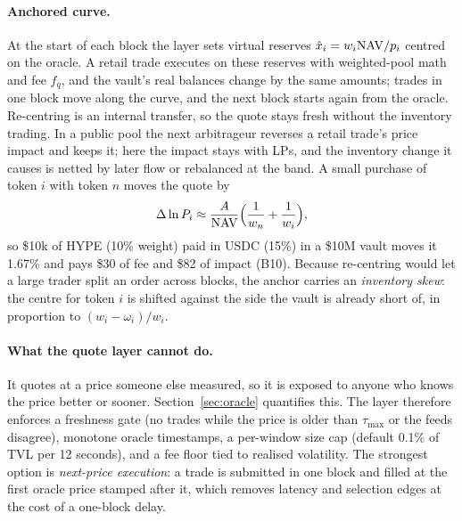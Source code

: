 \paragraph{Anchored curve.} At the start of each block the layer sets virtual reserves $\hat x_i=w_i\mathrm{NAV}/p_i$ centred on the oracle. A retail trade executes on these reserves with weighted-pool math and fee $f_q$, and the vault's real balances change by the same amounts; trades in one block move along the curve, and the next block starts again from the oracle. Re-centring is an internal transfer, so the quote stays fresh without the inventory trading. In a public pool the next arbitrageur reverses a retail trade's price impact and keeps it; here the impact stays with LPs, and the inventory change it causes is netted by later flow or rebalanced at the band. A small purchase of token $i$ with token $n$ moves the quote by
\begin{equation}
\Delta\ln P_i\approx\frac{A}{\mathrm{NAV}}\Big(\frac{1}{w_n}+\frac{1}{w_i}\Big),
\label{eq:impact}
\end{equation}
so \$10k of HYPE (10\% weight) paid in USDC (15\%) in a \$10M vault moves it 1.67\% and pays \$30 of fee and \$82 of impact (B10). Because re-centring would let a large trader split an order across blocks, the anchor carries an \emph{inventory skew}: the centre for token $i$ is shifted against the side the vault is already short of, in proportion to $(w_i-\omega_i)/w_i$.

\paragraph{What the quote layer cannot do.} It quotes at a price someone else measured, so it is exposed to anyone who knows the price better or sooner. Section~\ref{sec:oracle} quantifies this. The layer therefore enforces a freshness gate (no trades while the price is older than $\tau_{\max}$ or the feeds disagree), monotone oracle timestamps, a per-window size cap (default 0.1\% of TVL per 12 seconds), and a fee floor tied to realised volatility. The strongest option is \emph{next-price execution}: a trade is submitted in one block and filled at the first oracle price stamped after it, which removes latency and selection edges at the cost of a one-block delay.
